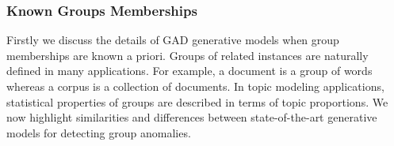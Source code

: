 


\subsubsection{Known Groups Memberships}
Firstly we discuss the details of GAD generative models when group memberships are known a priori. Groups of related instances are naturally defined in many applications. For example,  a document is a group of words whereas a corpus is a collection of documents.    
 In topic modeling applications, statistical properties of groups are described in terms of topic proportions. We now highlight similarities and differences between state-of-the-art generative models for detecting group anomalies. %

%

